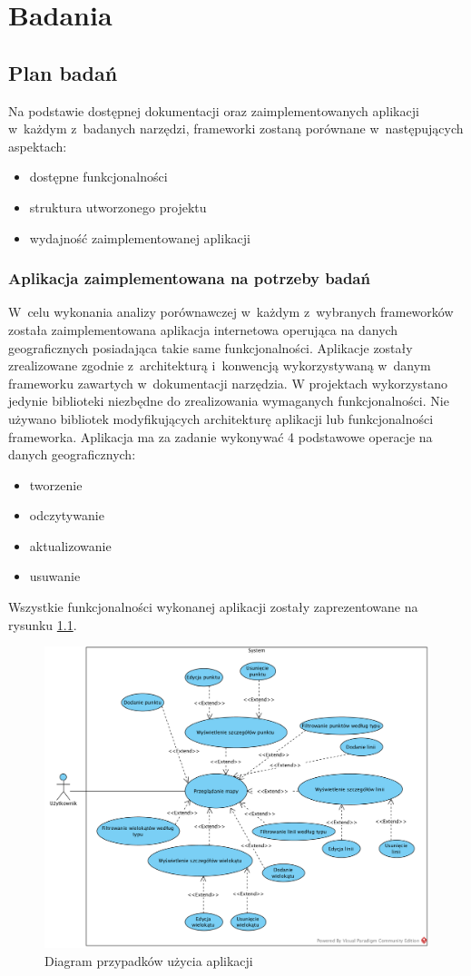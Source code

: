 \documentclass[archivemode]{mgr}
\begin{document}
\chapter{Badania}

\section{Plan badań}

Na podstawie dostępnej dokumentacji oraz zaimplementowanych aplikacji w~każdym z~badanych narzędzi, frameworki zostaną porównane w~następujących aspektach:
\begin{itemize}
  \item dostępne funkcjonalności
  \item struktura utworzonego projektu
  \item wydajność zaimplementowanej aplikacji
\end{itemize}


\subsection{Aplikacja zaimplementowana na potrzeby badań}

W~celu wykonania analizy porównawczej w~każdym z~wybranych frameworków została zaimplementowana aplikacja internetowa operująca na danych geograficznych posiadająca takie same funkcjonalności. Aplikacje zostały zrealizowane zgodnie z~architekturą i~konwencją wykorzystywaną w~danym frameworku zawartych w~dokumentacji narzędzia. W projektach wykorzystano jedynie biblioteki niezbędne do zrealizowania wymaganych funkcjonalności. Nie używano bibliotek modyfikujących architekturę aplikacji lub funkcjonalności frameworka.
Aplikacja ma za zadanie wykonywać 4 podstawowe operacje na danych geograficznych:
\begin{itemize}
  \item tworzenie
  \item odczytywanie
  \item aktualizowanie
  \item usuwanie
\end{itemize}

Wszystkie funkcjonalności wykonanej aplikacji zostały zaprezentowane na rysunku \ref{fig:use_cases}.

\begin{figure}[H]
  \centering
  \includegraphics[width=0.5\linewidth]{pictures/use_cases}
  \caption{Diagram przypadków użycia aplikacji}
  \label{fig:use_cases}
\end{figure}
\end{document}
